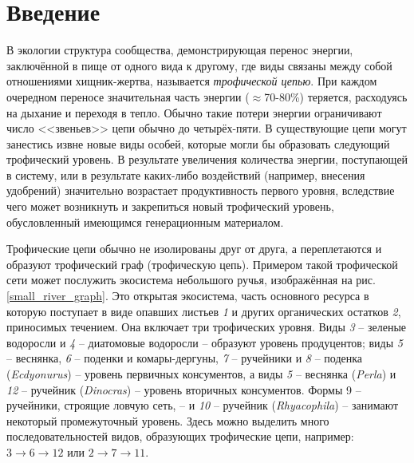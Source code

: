 \section{Введение}
    В экологии структура сообщества, демонстрирующая перенос энергии, заключённой в пище от одного вида к другому, где виды связаны между собой отношениями хищник-жертва, называется \textit{трофической цепью}. При каждом очередном переносе значительная часть энергии (\( \approx \)70-80\%) теряется, расходуясь на дыхание и переходя в тепло. Обычно такие потери энергии ограничивают число <<звеньев>> цепи обычно до четырёх-пяти. В существующие цепи могут занестись извне новые виды особей, которые могли бы образовать следующий трофический уровень. В результате увеличения количества энергии, поступающей в систему, или в результате каких-либо воздействий (например, внесения удобрений) значительно возрастает продуктивность первого уровня, вследствие чего может возникнуть и закрепиться новый трофический уровень, обусловленный имеющимся генерационным материалом.
    
    Трофические цепи обычно не изолированы друг от друга, а переплетаются и образуют трофический граф (трофическую цепь). Примером такой трофической сети может послужить экосистема небольшого ручья\cite{jones_river}, изображённая на рис. \ref{small_river_graph}.
    Это открытая экосистема, часть основного ресурса в которую поступает в виде опавших листьев \textit{1} и других органических остатков \textit{2}, приносимых течением. Она включает три трофических уровня. Виды \textit{3} -- зеленые водоросли и \textit{4} -- диатомовые водоросли -- образуют уровень продуцентов; виды \textit{5} -- веснянка, \textit{6} -- поденки и комары-дергуны, \textit{7} -- ручейники и \textit{8} -- поденка (\textit{Ecdyonurus}) -- уровень первичных консументов, а виды \textit{5} -- веснянка (\textit{Perla}) и \textit{12} -- ручейник (\textit{Dinocras}) -- уровень вторичных консументов. Формы 9 -- ручейники, строящие ловчую сеть, -- и \textit{10} -- ручейник (\textit{Rhyacophila}) -- занимают некоторый промежуточный уровень. Здесь можно выделить много последовательностей видов, образующих трофические цепи, например: \(3 \to 6 \to 12\) или \( 2 \to 7 \to 11 \). 

